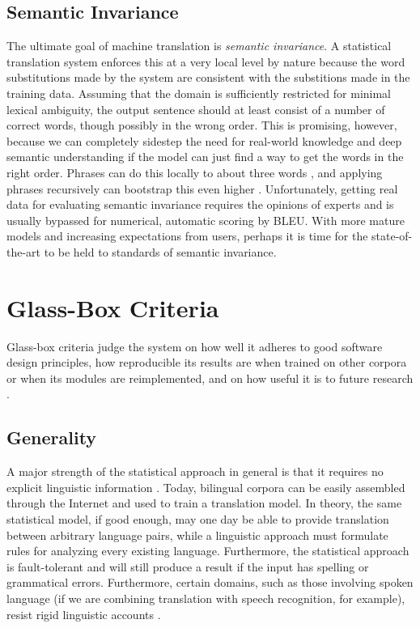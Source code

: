 \documentclass[11pt]{article}
\begin{document}
\subsection{Semantic Invariance}
The ultimate goal of machine translation is \textit{semantic invariance}.
A statistical translation system enforces this at a very local level by nature because 
the word substitutions made by the system are consistent with the substitions
made in the training data. Assuming that the domain is sufficiently restricted for minimal lexical ambiguity, the output sentence
should at least consist of a number of correct words, though possibly in the wrong order.
This is promising, however, because we can completely sidestep the need for 
real-world knowledge and deep semantic understanding if the model can just find a way to get the words in the right
order. Phrases can do this locally to about three words \cite{koehn:03}, and applying phrases recursively can
bootstrap this even higher \cite{chiang:05}. Unfortunately, getting real data for evaluating semantic invariance
requires the opinions of experts and is usually bypassed for numerical, automatic scoring by BLEU.
With more mature models and increasing expectations
from users, perhaps it is time for the state-of-the-art to be held to standards of semantic invariance.

\section{Glass-Box Criteria}
Glass-box criteria judge the system on how well it adheres to good software design principles,
how reproducible its results are when trained on other corpora or when its modules are reimplemented,
and on how useful it is to future research \cite{dorr_survey}.

\subsection{Generality}
A major strength of the statistical approach in general is that it requires no
explicit linguistic information \cite{brown:93}. Today, bilingual corpora can be
easily assembled through the Internet and used to train a translation model.
In theory, the same statistical model, if good enough, may one day be able to provide translation
between arbitrary language pairs,
while a linguistic approach must formulate rules for analyzing every existing language. Furthermore,
the statistical approach is fault-tolerant and will still produce a result if the input has 
spelling or grammatical errors. Furthermore, certain domains, such as those involving spoken language
(if we are combining translation with speech recognition, for example), resist rigid linguistic accounts \cite{och:99}.
\end{document}
